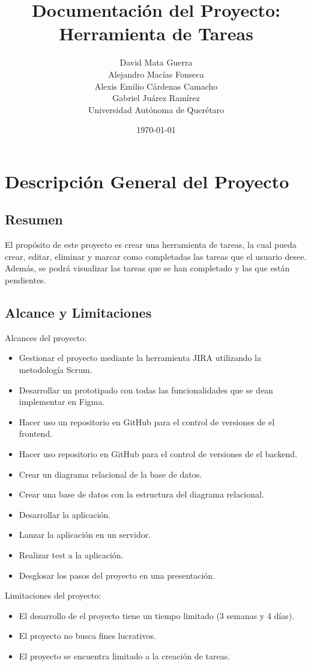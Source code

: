 \documentclass[a4paper, 12pt]{report}
\title{Documentación del Proyecto: Herramienta de Tareas}
\author{David Mata Guerra\\Alejandro Macías Fonseca\\Alexis Emilio Cárdenas Camacho\\Gabriel Juárez Ramírez \\ Universidad Autónoma de Querétaro}
\date{\today}
\begin{document}
	
	\maketitle
	\tableofcontents
	\newpage
	
	\chapter{Descripción General del Proyecto}
	\section{Resumen}
    El propósito de este proyecto es crear una herramienta de tareas, la cual pueda crear, editar, eliminar y marcar como completadas
    las tareas que el usuario desee. Además, se podrá visualizar las tareas que se han completado y las que están pendientes.
	
	\section{Alcance y Limitaciones}
	Alcances del proyecto:
    \begin{itemize}
        \item Gestionar el proyecto mediante la herramienta JIRA utilizando la metodología Scrum.
        \item Desarrollar un prototipado con todas las funcionalidades que se dean implementar en Figma.
        \item Hacer uso un repositorio en GitHub para el control de versiones de el frontend.
        \item Hacer uso repositorio en GitHub para el control de versiones de el backend.
        \item Crear un diagrama relacional de la base de datos.
        \item Crear una base de datos con la estructura del diagrama relacional.
        \item Desarrollar la aplicación.
        \item Lanzar la aplicación en un servidor.
        \item Realizar test a la aplicación.
        \item Desglosar los pasos del proyecto en una presentación.
    \end{itemize}

    Limitaciones del proyecto:
    \begin{itemize}
        \item El desarrollo de el proyecto tiene un tiempo limitado (3 semanas y 4 días).
        \item El proyecto no busca fines lucrativos.
        \item El proyecto se encuentra limitado a la creación de tareas.
    \end{itemize}
\end{document}
